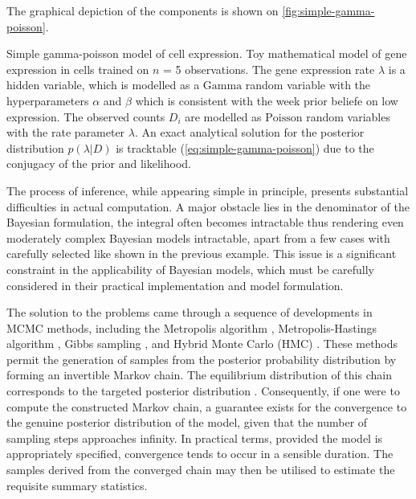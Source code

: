 The graphical depiction of the components is shown on \cref{fig:simple-gamma-poisson}.

    {Simple gamma-poisson model of cell expression.}
    {Toy mathematical model of gene expression in cells trained on $n$ = 5 observations. The gene expression rate $\lambda$ is a hidden variable, which is modelled as a $\text{Gamma}$ random variable with the hyperparameters $\alpha$ and $\beta$ which is consistent with the week prior beliefe on low expression. The observed counts $D_i$ are modelled as $\text{Poisson}$ random variables with the rate parameter $\lambda$. An exact analytical solution for the posterior distribution $p(\lambda|D)$ is tracktable (\cref{eq:simple-gamma-poisson}) due to the conjugacy of the prior and likelihood.}

The process of inference, while appearing simple in principle, presents substantial difficulties in actual computation. A major obstacle lies in the denominator of the Bayesian formulation, the integral often becomes intractable  thus rendering even moderately complex Bayesian models intractable, apart from a few cases with carefully selected  like shown in the previous example. This issue is a significant constraint in the applicability of Bayesian models, which must be carefully considered in their practical implementation and model formulation.

The solution to the problems came through a sequence of developments in \ac{MCMC} methods, including the Metropolis algorithm \parencite{Rosenbluth1953-gu}, Metropolis-Hastings algorithm \parencite{Hastings1970-mb}, Gibbs sampling \parencite{Geman1984-nk}, and Hybrid Monte Carlo (HMC) \parencite{Duane1987-gu}. These methods permit the generation of samples from the posterior probability distribution by forming an invertible Markov chain. The equilibrium distribution of this chain corresponds to the targeted posterior distribution \parencite{Roberts2004-op}. Consequently, if one were to compute the constructed Markov chain, a guarantee exists for the convergence to the genuine posterior distribution of the model, given that the number of sampling steps approaches infinity. In practical terms, provided the model is appropriately specified, convergence tends to occur in a sensible duration. The samples derived from the converged chain may then be utilised to estimate the requisite summary statistics. 

